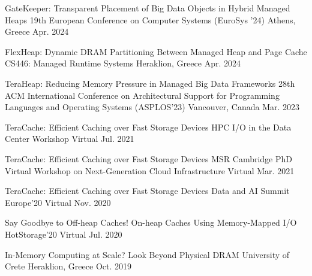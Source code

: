 

\begin{cvhonors}
  \cvhonor
    {GateKeeper: Transparent Placement of Big Data Objects in Hybrid Managed
    Heaps} %
    {19th European Conference on Computer Systems (EuroSys '24)} %
    {Athens, Greece} %
    {Apr. 2024} %
  
    \cvhonor
    {FlexHeap: Dynamic DRAM Partitioning Between Managed Heap and Page Cache} %
    {CS446: Managed Runtime Systems} %
    {Heraklion, Greece} %
    {Apr. 2024} %

  \cvhonor
    {TeraHeap: Reducing Memory Pressure in Managed Big Data Frameworks} %
    {28th ACM International Conference on Architectural Support for Programming
    Languages and Operating Systems (ASPLOS'23)} %
    {Vancouver, Canada} %
    {Mar. 2023} %

  \cvhonor
    {TeraCache: Efficient Caching over Fast Storage Devices} %
    {HPC I/O in the Data Center Workshop} %
    {Virtual} %
    {Jul. 2021} %

  \cvhonor
    {TeraCache: Efficient Caching over Fast Storage Devices} %
    {MSR Cambridge PhD Virtual Workshop on Next-Generation Cloud Infrastructure} %
    {Virtual} %
    {Mar. 2021} %

  \cvhonor
    {TeraCache: Efficient Caching over Fast Storage Devices} %
    {Data and AI Summit Europe'20} %
    {Virtual} %
    {Nov. 2020} %

  \cvhonor
    {Say Goodbye to Off-heap Caches! On-heap Caches Using Memory-Mapped I/O} %
    {HotStorage'20} %
    {Virtual} %
    {Jul. 2020} %

  \cvhonor
    {In-Memory Computing at Scale? Look Beyond Physical DRAM} %
    {University of Crete} %
    {Heraklion, Greece} %
    {Oct. 2019} %


\end{cvhonors}
